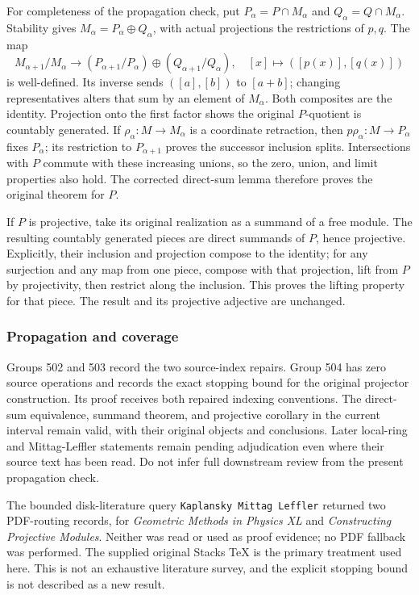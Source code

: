 For completeness of the propagation check, put \(P_\alpha=P\cap M_\alpha\) and \(Q_\alpha=Q\cap M_\alpha\). Stability gives \(M_\alpha=P_\alpha\oplus Q_\alpha\), with actual projections the restrictions of \(p,q\). The map \[
M_{\alpha+1}/M_\alpha\longrightarrow
(P_{\alpha+1}/P_\alpha)\oplus(Q_{\alpha+1}/Q_\alpha),
\quad [x]\longmapsto([p(x)],[q(x)])
\] is well-defined. Its inverse sends \(([a],[b])\) to \([a+b]\); changing representatives alters that sum by an element of \(M_\alpha\). Both composites are the identity. Projection onto the first factor shows the original \(P\)-quotient is countably generated. If \(\rho_\alpha:M\to M_\alpha\) is a coordinate retraction, then \(p\rho_\alpha:M\to P_\alpha\) fixes \(P_\alpha\); its restriction to \(P_{\alpha+1}\) proves the successor inclusion splits. Intersections with \(P\) commute with these increasing unions, so the zero, union, and limit properties also hold. The corrected direct-sum lemma therefore proves the original theorem for \(P\).

If \(P\) is projective, take its original realization as a summand of a free module. The resulting countably generated pieces are direct summands of \(P\), hence projective. Explicitly, their inclusion and projection compose to the identity; for any surjection and any map from one piece, compose with that projection, lift from \(P\) by projectivity, then restrict along the inclusion. This proves the lifting property for that piece. The result and its projective adjective are unchanged.

\subsubsection{Propagation and coverage}\label{propagation-and-coverage}

Groups 502 and 503 record the two source-index repairs. Group 504 has zero source operations and records the exact stopping bound for the original projector construction. Its proof receives both repaired indexing conventions. The direct-sum equivalence, summand theorem, and projective corollary in the current interval remain valid, with their original objects and conclusions. Later local-ring and Mittag-Leffler statements remain pending adjudication even where their source text has been read. Do not infer full downstream review from the present propagation check.

The bounded disk-literature query \texttt{Kaplansky\ Mittag\ Leffler} returned two PDF-routing records, for \emph{Geometric Methods in Physics XL} and \emph{Constructing Projective Modules}. Neither was read or used as proof evidence; no PDF fallback was performed. The supplied original Stacks TeX is the primary treatment used here. This is not an exhaustive literature survey, and the explicit stopping bound is not described as a new result.
